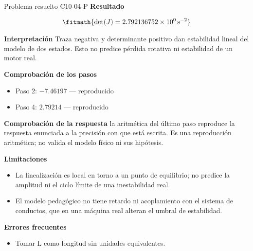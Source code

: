 \documentclass[10pt,openany]{book}
\begin{document}
\begin{studiumworked}{Problema resuelto C10-04-P}
\noindent\textbf{Resultado}

\[
\fitmath{\det(J)=2.792136752\times10^{0}\,\mathrm{s}^{-2}}
\]

\noindent\textbf{Interpretación}
Traza negativa y determinante positivo dan estabilidad lineal del modelo de dos estados. Esto no predice pérdida rotativa ni estabilidad de un motor real.

\noindent\textbf{Comprobación de los pasos}
\begin{itemize}
\item Paso 2: $-7.46197$ — reproducido
\item Paso 4: $2.79214$ — reproducido
\end{itemize}

\noindent\textbf{Comprobación de la respuesta} la aritmética del último paso reproduce la respuesta enunciada a la precisión con que está escrita. Es una reproducción aritmética; no valida el modelo físico ni sus hipótesis.

\noindent\textbf{Limitaciones}
\begin{itemize}
\item La linealización es local en torno a un punto de equilibrio; no predice la amplitud ni el ciclo límite de una inestabilidad real.
\item El modelo pedagógico no tiene retardo ni acoplamiento con el sistema de conductos, que en una máquina real alteran el umbral de estabilidad.
\end{itemize}

\noindent\textbf{Errores frecuentes}
\begin{itemize}
\item Tomar L como longitud sin unidades equivalentes.
\end{itemize}
\end{studiumworked}
\end{document}
